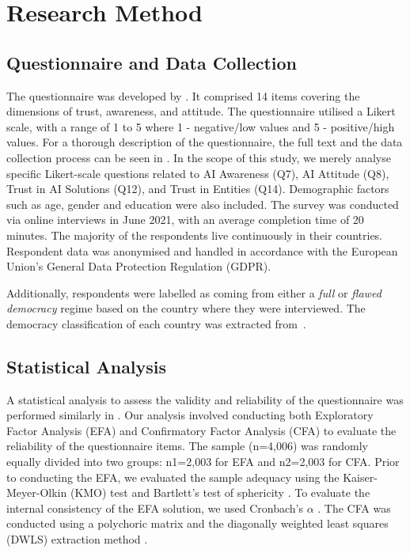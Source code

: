 \documentclass[
]{ceurart}
\begin{document}
\section{Research Method}
\subsection{Questionnaire and Data Collection}
The questionnaire was developed by \cite{scantamburlo2023artificial}. It comprised 14 items covering the dimensions of trust, awareness, and attitude. The questionnaire utilised a Likert scale, with a range of 1 to 5 where 1 - negative/low values and 5 - positive/high values. For a thorough description of the questionnaire, the full text and the data collection process can be seen in \cite{scantamburlo2023artificial}.
In the scope of this study, we merely analyse specific Likert-scale questions related to AI Awareness (Q7), AI Attitude (Q8), Trust in AI Solutions (Q12), and Trust in Entities (Q14). Demographic factors such as age, gender and education were also included. The survey was conducted via online interviews in June 2021, with an average completion time of 20 minutes. The majority of the respondents live continuously in their countries. Respondent data was anonymised and handled in accordance with the European Union's General  Data Protection Regulation (GDPR). 

Additionally, respondents were labelled as coming from either a \textit{full} or \textit{flawed democracy} regime based on the country where they were interviewed. The democracy classification of each country was extracted from~\cite{unit2022democracy}. 
  
\subsection{Statistical Analysis}

A statistical analysis to assess the validity and reliability of the questionnaire was performed similarly in \cite{scantamburlo2023artificial}. Our analysis involved conducting both Exploratory Factor Analysis (EFA) and Confirmatory Factor Analysis (CFA) to evaluate the reliability of the questionnaire items. The sample (n=4,006) was randomly equally divided into two groups: n1=2,003 for EFA and n2=2,003 for CFA. Prior to conducting the EFA, we evaluated the sample adequacy using the Kaiser-Meyer-Olkin (KMO) test  and Bartlett's test of sphericity \cite{kaiser1974index}.  To evaluate the internal consistency of the EFA solution, we used Cronbach's $\alpha$ \cite{gadermann2019estimating}. The CFA was conducted using a polychoric matrix and the diagonally weighted least squares (DWLS) extraction method \cite{li2016confirmatory}. 
\end{document}

